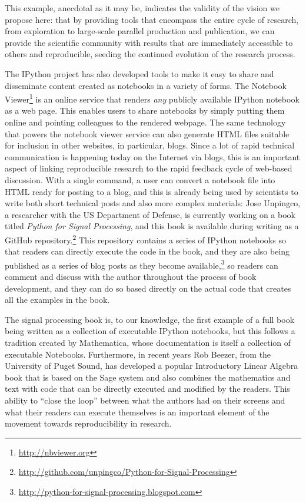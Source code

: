 \documentclass[ChapterTOCs,krantz2]{krantz} %
\begin{document}
This example, anecdotal as it may be, indicates the validity of the vision
we propose here: that by providing tools that encompass the entire cycle of
research, from exploration to large-scale parallel production and publication,
we can provide the scientific community with results that are immediately
accessible to others and reproducible, seeding the continued evolution of the
research process.

The IPython project has also developed tools to make it easy to share and
disseminate content created as notebooks in a variety of forms.  The Notebook
Viewer\footnote{\url{http://nbviewer.org}} is an online service that renders
\emph{any} publicly available IPython notebook as a web page.  This enables
users to share notebooks by simply putting them online and pointing colleagues
to the rendered webpage.  The same technology that powers the notebook viewer
service can also generate HTML files suitable for inclusion in other websites,
in particular, blogs.  Since a lot of rapid technical communication is
happening today on the Internet via blogs, this is an important aspect of
linking reproducible research to the rapid feedback cycle of web-based
discussion.  With a single command, a user can convert a notebook file into
HTML ready for posting to a blog, and this is already being used by scientists
to write both short technical posts and also more complex materials: Jose
Unpingco, a researcher with the US Department of Defense, is currently working
on a book titled \emph{Python for Signal Processing}, and this book is
available during writing as a GitHub
repository.\footnote{\url{http://github.com/unpingco/Python-for-Signal-Processing}}
This repository contains a series of IPython notebooks so that readers can
directly execute the code in the book, and they are also being published as a
series of blog posts as they become
available,\footnote{\url{http://python-for-signal-processing.blogspot.com}} so
readers can comment and discuss with the author throughout the process of book
development, and they can do so based directly on the actual code that creates
all the examples in the book.

The signal processing book is, to our knowledge, the first example of a full
book being written as a collection of executable IPython notebooks, but this
follows a tradition created by Mathematica, whose documentation is itself a
collection of executable Notebooks.  Furthermore, in recent years Rob Beezer,
from the University of Puget Sound, has developed a popular Introductory Linear
Algebra book \cite{beezer2009first} that is based on the Sage system and also
combines the mathematics and text with code that can be directly executed and
modified by the readers.  This ability to ``close the loop'' between what the
authors had on their screens and what their readers can execute themselves is
an important element of the movement towards reproducibility in research.
\end{document}

